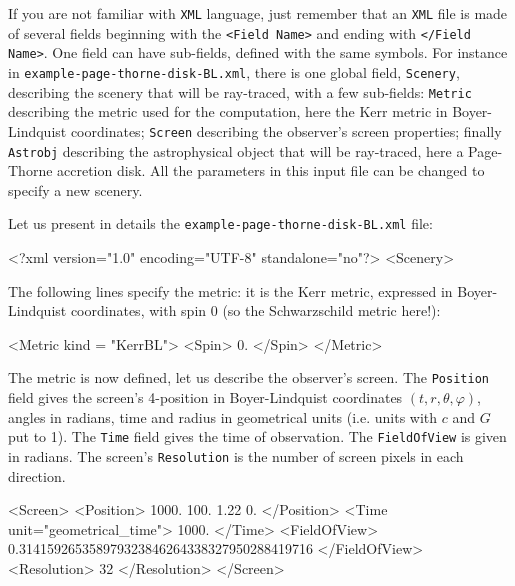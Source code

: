 \documentclass[a4paper,12pt]{article}
\begin{document}
\begin{sloppypar} %
If you are not familiar with \texttt{XML} language, just remember that an \texttt{XML} file is made of several fields beginning with the \texttt{<Field Name>} and ending with \texttt{</Field Name>}. One field can have sub-fields, defined with the same symbols. For instance in \texttt{example-page-thorne-disk-BL.xml}, there is one global field, \texttt{Scenery}, describing the scenery that will be ray-traced, with a few sub-fields: \texttt{Metric} describing the metric used for the computation, here the Kerr metric in Boyer-Lindquist coordinates; \texttt{Screen} describing the observer's screen properties; finally \texttt{Astrobj} describing the astrophysical object that will be ray-traced, here a Page-Thorne accretion disk.
All the parameters in this input file can be changed to specify a new scenery. 

Let us present in details the \texttt{example-page-thorne-disk-BL.xml} file:

\begin{code}
<?xml version="1.0" encoding="UTF-8" standalone="no"?>
<Scenery>
\end{code}

The following lines specify the metric: it is the Kerr metric, expressed in Boyer-Lindquist coordinates, with spin 0 (so the Schwarzschild metric here!):

\begin{code}
  <Metric kind = "KerrBL">
    <Spin>
      0.
    </Spin>
  </Metric>
\end{code}

The metric is now defined, let us describe the observer's screen.
The \texttt{Position} field gives the screen's 4-position 
in Boyer-Lindquist coordinates $(t,r,\theta,\varphi)$, 
angles in radians, time and radius in geometrical units  
(i.e. units with $c$ and $G$ put to 1). The \texttt{Time} field
gives the time of observation. The \texttt{FieldOfView} is given in radians.
The screen's \texttt{Resolution} is the number of screen pixels in each
direction.

\begin{code}
  <Screen>
    <Position>
      1000.
       100.
       1.22
       0.
    </Position>
    <Time unit="geometrical_time">
       1000.   
    </Time>
    <FieldOfView>
       0.314159265358979323846264338327950288419716
     </FieldOfView>
     <Resolution> 
       32   
     </Resolution>
  </Screen>
\end{code}


\end{sloppypar}
\end{document}
